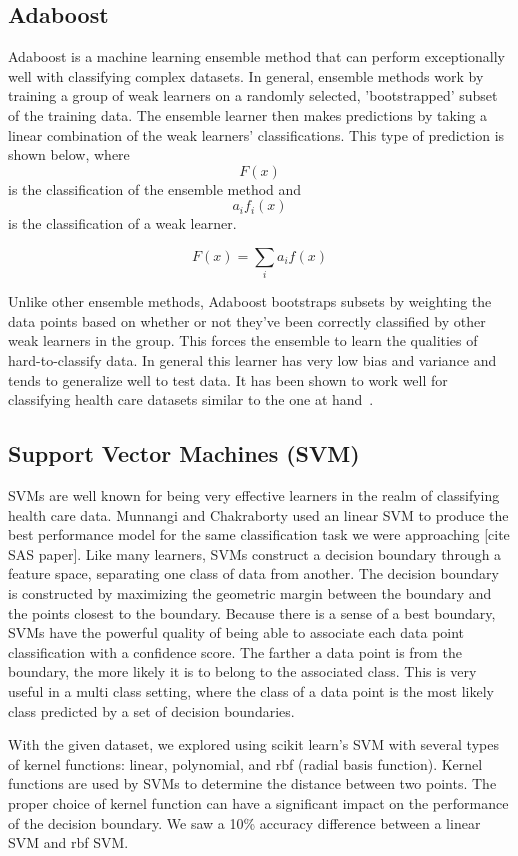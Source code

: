 \documentclass[conference]{IEEEtran}
\begin{document}
\subsection{Adaboost}
Adaboost is a machine learning ensemble method that can perform exceptionally well with classifying complex datasets. In general, ensemble methods work by training a group of weak learners on a randomly selected, 'bootstrapped' subset of the training data. The ensemble learner then makes predictions by taking a linear combination of the weak learners' classifications. This type of prediction is shown below, where \[F(x)\] is the classification of the ensemble method and \[a_{i}f_{i}(x)\] is the classification of a weak learner.

\[
	F(x) = \sum_{i} a_{i}f(x)
\]

Unlike other ensemble methods, Adaboost bootstraps subsets by weighting the data points based on whether or not they've been correctly classified by other weak learners in the group. This forces the ensemble to learn the qualities of hard-to-classify data. In general this learner has very low bias and variance and tends to generalize well to test data. It has been shown to work well for classifying health care datasets similar to the one at hand~\cite{adaboost-breast-cancer}.

\subsection{Support Vector Machines (SVM)}
SVMs are well known for being very effective learners in the realm of classifying health care data. Munnangi and Chakraborty used an linear SVM to produce the best performance model for the same classification task we were approaching [cite SAS paper]. Like many learners, SVMs construct a decision boundary through a feature space, separating one class of data from another. The decision boundary is constructed by maximizing the geometric margin between the boundary and the points closest to the boundary. Because there is a sense of a best boundary, SVMs have the powerful quality of being able to associate each data point classification with a confidence score. The farther a data point is from the boundary, the more likely it is to belong to the associated class. This is very useful in a multi class setting, where the class of a data point is the most likely class predicted by a set of decision boundaries.

With the given dataset, we explored using scikit learn's SVM with several types of kernel functions: linear, polynomial, and rbf (radial basis function). Kernel functions are used by SVMs to determine the distance between two points. The proper choice of kernel function can have a significant impact on the performance of the decision boundary. We saw a 10\% accuracy difference between a linear SVM and rbf SVM.
\end{document}
